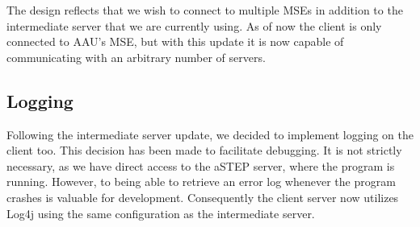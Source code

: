 The design reflects that we wish to connect to multiple MSEs in addition to the intermediate server that we are currently using. As of now the client is only connected to AAU's MSE, but with this update it is now capable of communicating with an arbitrary number of servers.

\subsection{Logging}
Following the intermediate server update, we decided to implement logging on the client too. This decision has been made to facilitate debugging. It is not strictly necessary, as we have direct access to the aSTEP server, where the program is running. However, to being able to retrieve an error log whenever the program crashes is valuable for development. Consequently the client server now utilizes Log4j \cite{log4j} using the same configuration as the intermediate server.
